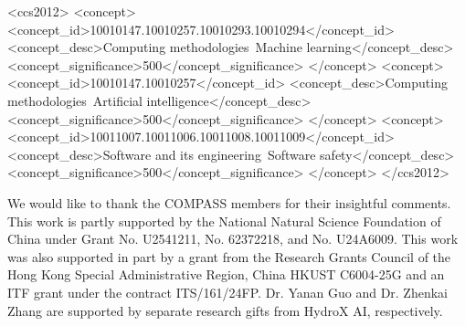 \documentclass[sigconf]{acmart}
\begin{document}
\begin{CCSXML}
<ccs2012>
 <concept>
  <concept_id>10010147.10010257.10010293.10010294</concept_id>
  <concept_desc>Computing methodologies~Machine learning</concept_desc>
  <concept_significance>500</concept_significance>
 </concept>
 <concept>
  <concept_id>10010147.10010257</concept_id>
  <concept_desc>Computing methodologies~Artificial intelligence</concept_desc>
  <concept_significance>500</concept_significance>
 </concept>
 <concept>
  <concept_id>10011007.10011006.10011008.10011009</concept_id>
  <concept_desc>Software and its engineering~Software safety</concept_desc>
  <concept_significance>500</concept_significance>
 </concept>
</ccs2012>
\end{CCSXML}


\maketitle












\begin{acks}
We would like to thank the COMPASS members for their insightful comments. This work is partly supported by the National Natural Science Foundation of China under Grant No. U2541211, No. 62372218, and No. U24A6009. This work was also supported in part by a grant from the Research Grants Council of the Hong Kong Special Administrative Region, China HKUST C6004-25G and an ITF grant under the contract ITS/161/24FP. Dr. Yanan Guo and Dr. Zhenkai Zhang are supported by separate research gifts from HydroX AI, respectively.
\end{acks}

\newpage
\balance



\appendix
% 
\end{document}
